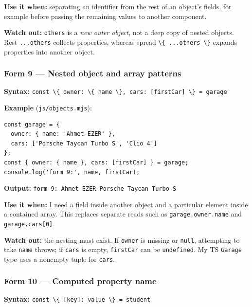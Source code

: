 \documentclass[
  9pt,
]{article}
\newcommand{\passthrough}[1]{#1}
\begin{document}
\textbf{Use it when:} separating an identifier from the rest of an
object's fields, for example before passing the remaining values to
another component.

\textbf{Watch out:} \passthrough{\lstinline!others!} is a \emph{new
outer object}, not a deep copy of nested objects. Rest
\passthrough{\lstinline!...others!} collects properties, whereas spread
\passthrough{\lstinline!\{ ...others \}!} expands properties into
another object.

\subsubsection{Form 9 --- Nested object and array
patterns}\label{form-9-nested-object-and-array-patterns}

\textbf{Syntax:}
\passthrough{\lstinline!const \{ owner: \{ name \}, cars: [firstCar] \} = garage!}

\textbf{Example} (\passthrough{\lstinline!js/objects.mjs!}):

\begin{lstlisting}
const garage = {
  owner: { name: 'Ahmet EZER' },
  cars: ['Porsche Taycan Turbo S', 'Clio 4']
};
const { owner: { name }, cars: [firstCar] } = garage;
console.log('form 9:', name, firstCar);
\end{lstlisting}

\textbf{Output:}
\passthrough{\lstinline!form 9: Ahmet EZER Porsche Taycan Turbo S!}

\textbf{Use it when:} I need a field inside another object and a
particular element inside a contained array. This replaces separate
reads such as \passthrough{\lstinline!garage.owner.name!} and
\passthrough{\lstinline!garage.cars[0]!}.

\textbf{Watch out:} the nesting must exist. If
\passthrough{\lstinline!owner!} is missing or
\passthrough{\lstinline!null!}, attempting to take
\passthrough{\lstinline!name!} throws; if \passthrough{\lstinline!cars!}
is empty, \passthrough{\lstinline!firstCar!} can be
\passthrough{\lstinline!undefined!}. My TS
\passthrough{\lstinline!Garage!} type uses a nonempty tuple for
\passthrough{\lstinline!cars!}.

\subsubsection{Form 10 --- Computed property
name}\label{form-10-computed-property-name}

\textbf{Syntax:}
\passthrough{\lstinline!const \{ [key]: value \} = student!}
\end{document}
